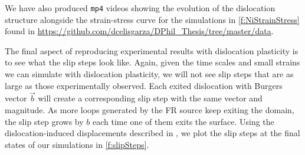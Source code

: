 We have also produced \texttt{mp4} videos showing the evolution of the dislocation structure alongside the strain-stress curve for the simulations in \cref{f:NiStrainStress} found in \href{https://github.com/dcelisgarza/DPhil_Thesis/tree/master/data}{https://github.com/dcelisgarza/DPhil\_Thesis/tree/master/data}.

The final aspect of reproducing experimental results with dislocation plasticity is to see what the slip steps look like. Again, given the time scales and small strains we can simulate with dislocation plasticity, we will not see slip steps that are as large as those experimentally observed. Each exited dislocation with Burgers vector $\vec{b}$ will create a corresponding slip step with the same vector and magnitude. As more loops generated by the FR source keep exiting the domain, the slip step grows by $b$ each time one of them exits the surface. Using the dislocation-induced displacements described in \cite{bromage2018calculating}, we plot the slip steps at the final states of our simulations in \cref{f:slipSteps}.

